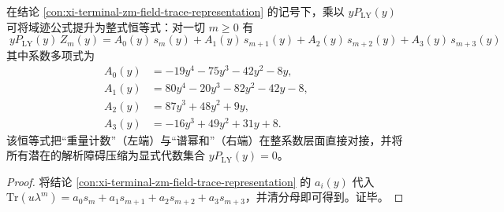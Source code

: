 \begin{conclusion}\label{con:xi-terminal-zm-integral-identity-power-sums}
在结论 \ref{con:xi-terminal-zm-field-trace-representation} 的记号下，乘以 \(yP_{\mathrm{LY}}(y)\) 可将域迹公式提升为整式恒等式：对一切 \(m\ge 0\) 有
\[
\boxed{\;
yP_{\mathrm{LY}}(y)\,Z_m(y)
=A_0(y)\,s_m(y)+A_1(y)\,s_{m+1}(y)+A_2(y)\,s_{m+2}(y)+A_3(y)\,s_{m+3}(y)\;}
\]
其中系数多项式为
\[
\boxed{\;
\begin{aligned}
A_0(y)&=-19y^4-75y^3-42y^2-8y,\\
A_1(y)&=80y^4-20y^3-82y^2-42y-8,\\
A_2(y)&=87y^3+48y^2+9y,\\
A_3(y)&=-16y^3+49y^2+31y+8.
\end{aligned}}
\]
该恒等式把“重量计数”（左端）与“谱幂和”（右端）在整系数层面直接对接，并将所有潜在的解析障碍压缩为显式代数集合 \(yP_{\mathrm{LY}}(y)=0\)。
\end{conclusion}
\begin{proof}
将结论 \ref{con:xi-terminal-zm-field-trace-representation} 的 \(a_i(y)\) 代入
\(
\mathrm{Tr}(u\lambda^m)=a_0 s_m+a_1 s_{m+1}+a_2 s_{m+2}+a_3 s_{m+3}
\)，并清分母即可得到。证毕。
\end{proof}

